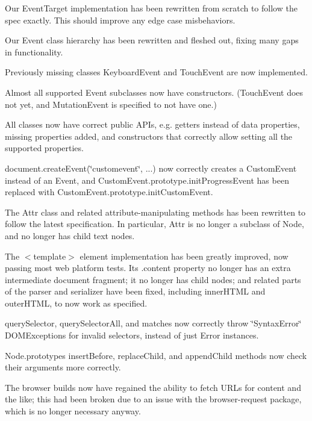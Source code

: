 \begin{DoxyItemize}
\item Our {\ttfamily Event\+Target} implementation has been rewritten from scratch to follow the spec exactly. This should improve any edge case misbehaviors.
\item Our {\ttfamily Event} class hierarchy has been rewritten and fleshed out, fixing many gaps in functionality.
\begin{DoxyItemize}
\item Previously missing classes {\ttfamily Keyboard\+Event} and {\ttfamily Touch\+Event} are now implemented.
\item Almost all supported {\ttfamily Event} subclasses now have constructors. ({\ttfamily Touch\+Event} does not yet, and {\ttfamily Mutation\+Event} is specified to not have one.)
\item All classes now have correct public A\+P\+Is, e.\+g. getters instead of data properties, missing properties added, and constructors that correctly allow setting all the supported properties.
\item {\ttfamily document.\+create\+Event(\char`\"{}customevent\char`\"{}, ...)} now correctly creates a {\ttfamily Custom\+Event} instead of an {\ttfamily Event}, and {\ttfamily Custom\+Event.\+prototype.\+init\+Progress\+Event} has been replaced with {\ttfamily Custom\+Event.\+prototype.\+init\+Custom\+Event}.
\end{DoxyItemize}
\item The {\ttfamily Attr} class and related attribute-\/manipulating methods has been rewritten to follow the latest specification. In particular, {\ttfamily Attr} is no longer a subclass of {\ttfamily Node}, and no longer has child text nodes.
\item The {\ttfamily $<$template$>$} element implementation has been greatly improved, now passing most web platform tests. Its {\ttfamily .content} property no longer has an extra intermediate document fragment; it no longer has child nodes; and related parts of the parser and serializer have been fixed, including {\ttfamily inner\+H\+T\+ML} and {\ttfamily outer\+H\+T\+ML}, to now work as specified.
\item {\ttfamily query\+Selector}, {\ttfamily query\+Selector\+All}, and {\ttfamily matches} now correctly throw {\ttfamily \char`\"{}\+Syntax\+Error\char`\"{}} {\ttfamily D\+O\+M\+Exception}s for invalid selectors, instead of just {\ttfamily Error} instances.
\item {\ttfamily Node.\+prototype}\textquotesingle{}s {\ttfamily insert\+Before}, {\ttfamily replace\+Child}, and {\ttfamily append\+Child} methods now check their arguments more correctly.
\item The browser builds now have regained the ability to fetch U\+R\+Ls for content and the like; this had been broken due to an issue with the browser-\/request package, which is no longer necessary anyway.
\end{DoxyItemize}

